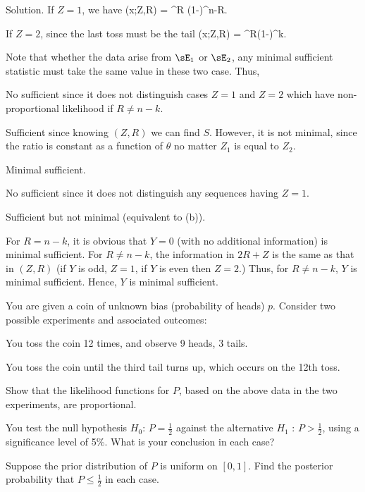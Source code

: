 Solution. If $Z=1$, we have
\be
\pro(x;Z,R) = \theta^R (1-\theta)^{n-R}.%
\ee

If $Z=2$, since the last toss must be the tail
\be
\pro(x;Z,R) = \theta^R(1-\theta)^k.%
\ee

Note that whether the data arise from $\sE_1$ or $\sE_2$, any minimal sufficient statistic must take the same value in these two case. Thus,
\ben
\item [(a)] No sufficient since it does not distinguish cases $Z=1$ and $Z=2$ which have non-proportional likelihood if $R\neq n-k$.
\item [(b)] Sufficient since knowing $(Z,R)$ we can find $S$. However, it is not minimal, since the ratio
\be
{}
\ee
is constant as a function of $\theta$ no matter $Z_1$ is equal to $Z_2$.
\item [(c)] Minimal sufficient.
\item [(d)] No sufficient since it does not distinguish any sequences having $Z=1$.
\item [(e)] Sufficient but not minimal (equivalent to (b)).
\item [(f)] For $R=n-k$, it is obvious that $Y=0$ (with no additional information) is minimal sufficient. For $R \neq n-k$, the information in $2R+Z$ is the same as that in $(Z,R)$ (if $Y$ is odd, $Z=1$, if $Y$ is even then $Z=2$.) Thus, for $R\neq n-k$, $Y$ is minimal sufficient. Hence, $Y$ is minimal sufficient.
\een





\item You are given a coin of unknown bias (probability of heads) $p$. Consider two possible experiments and associated outcomes:
\ben
\item [(i)] You toss the coin 12 times, and observe 9 heads, 3 tails.
\item [(ii)] You toss the coin until the third tail turns up, which occurs on the 12th toss.
\een
\ben
\item [(a)] Show that the likelihood functions for $P$, based on the above data in the two experiments, are proportional.
\item [(b)] You test the null hypothesis $H_0$: $P = \frac 12$ against the alternative $H_1$ : $P > \frac 12$, using a significance level of 5\%. What is your conclusion in each case?
\item [(c)] Suppose the prior distribution of $P$ is uniform on $[0, 1]$. Find the posterior probability that $P \leq  \frac 12$ in each case.
\een



